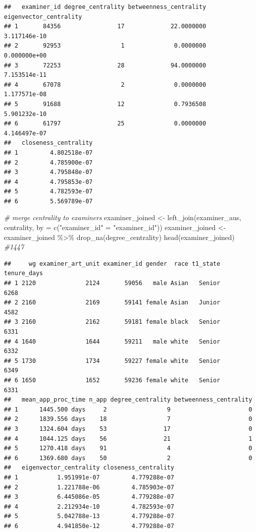 \documentclass[
]{article}
\newenvironment{Shaded}{\begin{snugshade}}{\end{snugshade}}
\newcommand{\AttributeTok}[1]{\textcolor[rgb]{0.77,0.63,0.00}{#1}}
\newcommand{\CommentTok}[1]{\textcolor[rgb]{0.56,0.35,0.01}{\textit{#1}}}
\newcommand{\FunctionTok}[1]{\textcolor[rgb]{0.00,0.00,0.00}{#1}}
\newcommand{\NormalTok}[1]{#1}
\newcommand{\OtherTok}[1]{\textcolor[rgb]{0.56,0.35,0.01}{#1}}
\newcommand{\SpecialCharTok}[1]{\textcolor[rgb]{0.00,0.00,0.00}{#1}}
\newcommand{\StringTok}[1]{\textcolor[rgb]{0.31,0.60,0.02}{#1}}
\begin{document}
\begin{verbatim}
##   examiner_id degree_centrality betweenness_centrality eigenvector_centrality
## 1       84356                17             22.0000000           3.117146e-10
## 2       92953                 1              0.0000000           0.000000e+00
## 3       72253                28             94.0000000           7.153514e-11
## 4       67078                 2              0.0000000           1.177571e-08
## 5       91688                12              0.7936508           5.901232e-10
## 6       61797                25              0.0000000           4.146497e-07
##   closeness_centrality
## 1         4.802518e-07
## 2         4.785900e-07
## 3         4.795848e-07
## 4         4.795853e-07
## 5         4.782593e-07
## 6         5.569789e-07
\end{verbatim}

\begin{Shaded}
\begin{Highlighting}[]
\CommentTok{\# merge centrality to examiners}
\NormalTok{examiner\_joined }\OtherTok{\textless{}{-}} \FunctionTok{left\_join}\NormalTok{(examiner\_aus, centrality, }\AttributeTok{by =} \FunctionTok{c}\NormalTok{(}\StringTok{"examiner\_id"} \OtherTok{=} \StringTok{"examiner\_id"}\NormalTok{))}
\NormalTok{examiner\_joined }\OtherTok{\textless{}{-}}\NormalTok{ examiner\_joined }\SpecialCharTok{\%\textgreater{}\%}
  \FunctionTok{drop\_na}\NormalTok{(degree\_centrality)}
\FunctionTok{head}\NormalTok{(examiner\_joined) }\CommentTok{\#1447}
\end{Highlighting}
\end{Shaded}

\begin{verbatim}
##     wg examiner_art_unit examiner_id gender  race t1_state tenure_days
## 1 2120              2124       59056   male Asian   Senior        6268
## 2 2160              2169       59141 female Asian   Junior        4582
## 3 2160              2162       59181 female black   Senior        6331
## 4 1640              1644       59211   male white   Senior        6332
## 5 1730              1734       59227 female white   Senior        6349
## 6 1650              1652       59236 female white   Senior        6331
##   mean_app_proc_time n_app degree_centrality betweenness_centrality
## 1      1445.500 days     2                 9                      0
## 2      1839.556 days    18                 7                      0
## 3      1324.604 days    53                17                      0
## 4      1044.125 days    56                21                      1
## 5      1270.418 days    91                 4                      0
## 6      1369.680 days    50                 2                      0
##   eigenvector_centrality closeness_centrality
## 1           1.951991e-07         4.779288e-07
## 2           1.221788e-06         4.785903e-07
## 3           6.445086e-05         4.779288e-07
## 4           2.212934e-10         4.782593e-07
## 5           5.042788e-13         4.779288e-07
## 6           4.941850e-12         4.779288e-07
\end{verbatim}
\end{document}
